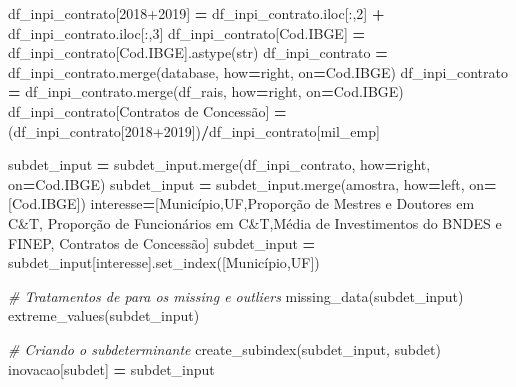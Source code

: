 \documentclass[
  12,
  dvipsnames]{article}
\newenvironment{Shaded}{\begin{snugshade}}{\end{snugshade}}
\newcommand{\BuiltInTok}[1]{#1}
\newcommand{\CommentTok}[1]{\textcolor[rgb]{0.56,0.35,0.01}{\textit{#1}}}
\newcommand{\DecValTok}[1]{\textcolor[rgb]{0.00,0.00,0.81}{#1}}
\newcommand{\NormalTok}[1]{#1}
\newcommand{\OperatorTok}[1]{\textcolor[rgb]{0.81,0.36,0.00}{\textbf{#1}}}
\newcommand{\StringTok}[1]{\textcolor[rgb]{0.31,0.60,0.02}{#1}}
\begin{document}
\begin{Shaded}
\begin{Highlighting}[]
\NormalTok{df\_inpi\_contrato[}\StringTok{\textquotesingle{}2018+2019\textquotesingle{}}\NormalTok{] }\OperatorTok{=}\NormalTok{ df\_inpi\_contrato.iloc[:,}\DecValTok{2}\NormalTok{] }\OperatorTok{+}\NormalTok{ df\_inpi\_contrato.iloc[:,}\DecValTok{3}\NormalTok{]}
\NormalTok{df\_inpi\_contrato[}\StringTok{\textquotesingle{}Cod.IBGE\textquotesingle{}}\NormalTok{] }\OperatorTok{=}\NormalTok{ df\_inpi\_contrato[}\StringTok{\textquotesingle{}Cod.IBGE\textquotesingle{}}\NormalTok{].astype(}\BuiltInTok{str}\NormalTok{)}
\NormalTok{df\_inpi\_contrato }\OperatorTok{=}\NormalTok{ df\_inpi\_contrato.merge(database, how}\OperatorTok{=}\StringTok{\textquotesingle{}right\textquotesingle{}}\NormalTok{, on}\OperatorTok{=}\StringTok{\textquotesingle{}Cod.IBGE\textquotesingle{}}\NormalTok{)}
\NormalTok{df\_inpi\_contrato }\OperatorTok{=}\NormalTok{ df\_inpi\_contrato.merge(df\_rais, how}\OperatorTok{=}\StringTok{\textquotesingle{}right\textquotesingle{}}\NormalTok{, on}\OperatorTok{=}\StringTok{\textquotesingle{}Cod.IBGE\textquotesingle{}}\NormalTok{)}
\NormalTok{df\_inpi\_contrato[}\StringTok{\textquotesingle{}Contratos de Concessão\textquotesingle{}}\NormalTok{] }\OperatorTok{=}\NormalTok{ (df\_inpi\_contrato[}\StringTok{\textquotesingle{}2018+2019\textquotesingle{}}\NormalTok{])}\OperatorTok{/}\NormalTok{df\_inpi\_contrato[}\StringTok{\textquotesingle{}mil\_emp\textquotesingle{}}\NormalTok{]}

\NormalTok{subdet\_input }\OperatorTok{=}\NormalTok{ subdet\_input.merge(df\_inpi\_contrato, how}\OperatorTok{=}\StringTok{\textquotesingle{}right\textquotesingle{}}\NormalTok{, on}\OperatorTok{=}\StringTok{\textquotesingle{}Cod.IBGE\textquotesingle{}}\NormalTok{)}
\NormalTok{subdet\_input }\OperatorTok{=}\NormalTok{ subdet\_input.merge(amostra, how}\OperatorTok{=}\StringTok{\textquotesingle{}left\textquotesingle{}}\NormalTok{, on}\OperatorTok{=}\NormalTok{[}\StringTok{\textquotesingle{}Cod.IBGE\textquotesingle{}}\NormalTok{])}
\NormalTok{interesse}\OperatorTok{=}\NormalTok{[}\StringTok{\textquotesingle{}Município\textquotesingle{}}\NormalTok{,}\StringTok{\textquotesingle{}UF\textquotesingle{}}\NormalTok{,}\StringTok{\textquotesingle{}Proporção de Mestres e Doutores em C\&T\textquotesingle{}}\NormalTok{,}
           \StringTok{\textquotesingle{}Proporção de Funcionários em C\&T\textquotesingle{}}\NormalTok{,}\StringTok{\textquotesingle{}Média de Investimentos do BNDES e FINEP\textquotesingle{}}\NormalTok{,}
           \StringTok{\textquotesingle{}Contratos de Concessão\textquotesingle{}}\NormalTok{]}
\NormalTok{subdet\_input }\OperatorTok{=}\NormalTok{ subdet\_input[interesse].set\_index([}\StringTok{\textquotesingle{}Município\textquotesingle{}}\NormalTok{,}\StringTok{\textquotesingle{}UF\textquotesingle{}}\NormalTok{])}

\CommentTok{\# Tratamentos de para os missing e outliers}
\NormalTok{missing\_data(subdet\_input)}
\NormalTok{extreme\_values(subdet\_input)}

\CommentTok{\# Criando o subdeterminante}
\NormalTok{create\_subindex(subdet\_input, subdet)}
\NormalTok{inovacao[subdet] }\OperatorTok{=}\NormalTok{ subdet\_input}
\end{Highlighting}
\end{Shaded}
\end{document}
